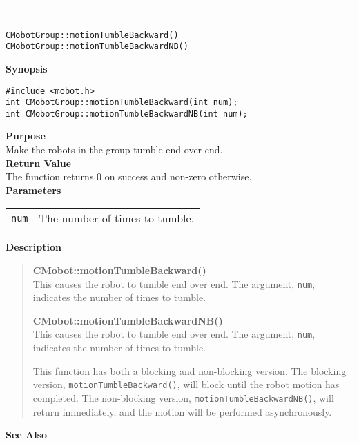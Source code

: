 \noindent
\vspace{5pt}
\rule{4.5in}{0.015in}\\
\noindent
{\LARGE \texttt{CMobotGroup::motionTumbleBackward()}}\\
{\LARGE \texttt{CMobotGroup::motionTumbleBackwardNB()}}\\
{}

\noindent
{\bf Synopsis}
\vspace{-8pt}
\begin{verbatim}
#include <mobot.h>
int CMobotGroup::motionTumbleBackward(int num);
int CMobotGroup::motionTumbleBackwardNB(int num);
\end{verbatim}

\noindent
{\bf Purpose}\\
Make the robots in the group tumble end over end.\\

\noindent
{\bf Return Value}\\
The function returns 0 on success and non-zero otherwise.\\

\noindent
{\bf Parameters}\\
\vspace{-0.1in}
\begin{description}
\item               
\begin{tabular}{p{10 mm}p{145 mm}}
\texttt{num} & The number of times to tumble. \\
\end{tabular}
\end{description}

\noindent
{\bf Description}\\
\vspace{-12pt}
\begin{quote}
{\bf CMobot::motionTumbleBackward()}\\
This causes the robot to tumble end over end. The argument, \texttt{num},
indicates the number of times to tumble.

{\bf CMobot::motionTumbleBackwardNB()}\\
This causes the robot to tumble end over end. The argument, \texttt{num},
indicates the number of times to tumble.

This function has both a blocking and non-blocking version.
The blocking version, \texttt{motionTumbleBackward()}, will block until the
robot motion has completed. The non-blocking version, \texttt{motionTumbleBackwardNB()},
will return immediately, and the motion will be performed asynchronously.\\
\end{quote}

\noindent
{\bf See Also}\\

